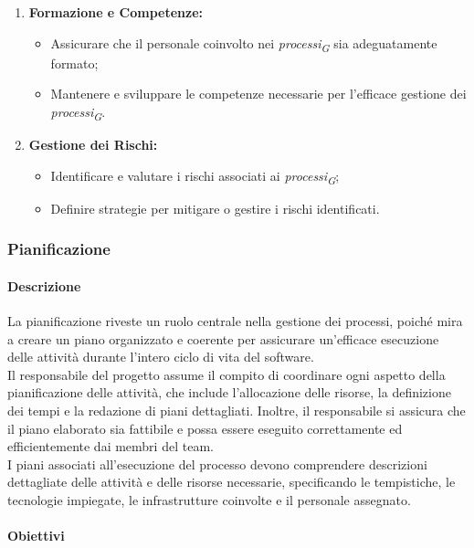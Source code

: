 \begin{enumerate}
    \item \textbf{Formazione e Competenze:}
      \begin{itemize}
        \item Assicurare che il personale coinvolto nei \textit{processi}\textsubscript{\textit{G}} sia adeguatamente formato;
        \item Mantenere e sviluppare le competenze necessarie per l'efficace gestione dei \textit{processi}\textsubscript{\textit{G}}.
      \end{itemize}
  
    \item \textbf{Gestione dei Rischi:}
      \begin{itemize}
        \item Identificare e valutare i rischi associati ai \textit{processi}\textsubscript{\textit{G}};
        \item Definire strategie per mitigare o gestire i rischi identificati.
      \end{itemize}
  \end{enumerate}
  
\subsubsection{Pianificazione}

\paragraph{Descrizione}
La pianificazione riveste un ruolo centrale nella gestione dei processi, poiché mira a creare un piano organizzato e coerente per assicurare un'efficace esecuzione delle attività durante l'intero ciclo di vita del software. \\
Il responsabile del progetto assume il compito di coordinare ogni aspetto della pianificazione delle attività, che include l'allocazione delle risorse, la definizione dei tempi e la redazione di piani dettagliati. Inoltre, il responsabile si assicura che il piano elaborato sia fattibile e possa essere eseguito correttamente ed efficientemente dai membri del team. \\
I piani associati all'esecuzione del processo devono comprendere descrizioni dettagliate delle attività e delle risorse necessarie, specificando le tempistiche, le tecnologie impiegate, le infrastrutture coinvolte e il personale assegnato.

\paragraph{Obiettivi}

